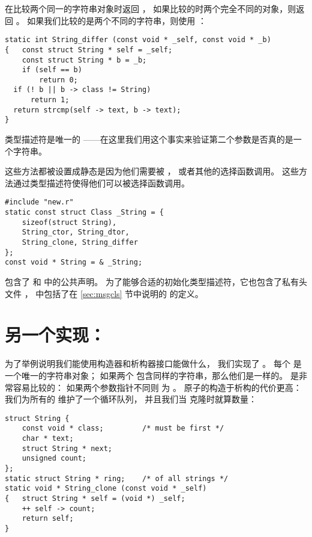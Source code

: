  在比较两个同一的字符串对象时返回 ，
如果比较的时两个完全不同的对象，则返回 。
如果我们比较的是两个不同的字符串，则使用 ：
\begin{lstlisting}
static int String_differ (const void * _self, const void * _b)
{   const struct String * self = _self;
    const struct String * b = _b;
    if (self == b)
        return 0;
  if (! b || b -> class != String)
      return 1;
  return strcmp(self -> text, b -> text);
}
\end{lstlisting}

类型描述符是唯一的
——在这里我们用这个事实来验证第二个参数是否真的是一个字符串。

这些方法都被设置成静态是因为他们需要被
， 或者其他的选择函数调用。 这些方法通过类型描述符使得他们可以被选择函数调用。

\begin{lstlisting}
#include "new.r"
static const struct Class _String = {
    sizeof(struct String),
    String_ctor, String_dtor,
    String_clone, String_differ
};
const void * String = & _String;
\end{lstlisting}

 包含了  和  中的公共声明。
为了能够合适的初始化类型描述符，它也包含了私有头文件 ，
 中包括了在 \ref{sec:msgcls} 节中说明的
 的定义。

\section{另一个实现：}
\label{sec:atom}

为了举例说明我们能使用构造器和析构器接口能做什么，
我们实现了 。
每个  是一个唯一的字符串对象；
如果两个  包含同样的字符串，那么他们是一样的。
 是非常容易比较的：
如果两个参数指针不同则  为 。
原子的构造于析构的代价更高：
我们为所有的  维护了一个循环队列，
并且我们当  克隆时就算数量：
\begin{lstlisting}
struct String {
    const void * class;         /* must be first */
    char * text;
    struct String * next;
    unsigned count;
};
static struct String * ring;    /* of all strings */
static void * String_clone (const void * _self)
{   struct String * self = (void *) _self;
    ++ self -> count;
    return self;
}
\end{lstlisting}

